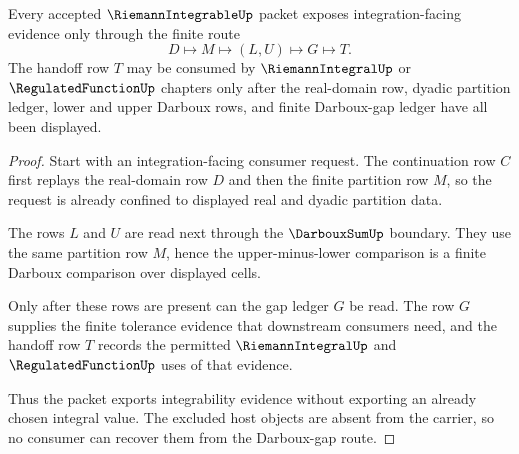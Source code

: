 \begin{theorem}
\label{thm:riemann-integrable-darboux-gap-route}
Every accepted $\RiemannIntegrableUp$ packet exposes integration-facing evidence only through the finite route
$$
D\longmapsto M\longmapsto (L,U)\longmapsto G\longmapsto T .
$$
The handoff row $T$ may be consumed by $\RiemannIntegralUp$ or $\RegulatedFunctionUp$ chapters only after the real-domain row, dyadic partition ledger, lower and upper Darboux rows, and finite Darboux-gap ledger have all been displayed.
\end{theorem}
\begin{proof}
Start with an integration-facing consumer request. The continuation row $C$ first replays the real-domain row $D$ and then the finite partition row $M$, so the request is already confined to displayed real and dyadic partition data.

The rows $L$ and $U$ are read next through the $\DarbouxSumUp$ boundary. They use the same partition row $M$, hence the upper-minus-lower comparison is a finite Darboux comparison over displayed cells.

Only after these rows are present can the gap ledger $G$ be read. The row $G$ supplies the finite tolerance evidence that downstream consumers need, and the handoff row $T$ records the permitted $\RiemannIntegralUp$ and $\RegulatedFunctionUp$ uses of that evidence.

Thus the packet exports integrability evidence without exporting an already chosen integral value. The excluded host objects are absent from the carrier, so no consumer can recover them from the Darboux-gap route.
\end{proof}


